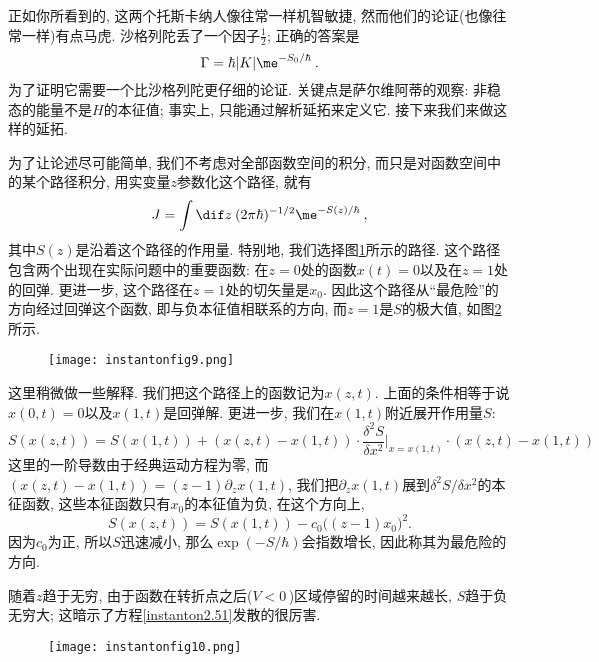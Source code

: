 正如你所看到的, 这两个托斯卡纳人像往常一样机智敏捷, 然而他们的论证(也像往常一样)有点马虎. 沙格列陀丢了一个因子$\tfrac{1}{2}$; 正确的答案是
\begin{equation}
    \Gamma= \hbar \lvert K \rvert \me^{-S_{0}/\hbar} \:. \label{instanton2.50}
\end{equation}
为了证明它需要一个比沙格列陀更仔细的论证. 关键点是萨尔维阿蒂的观察: 非稳态的能量不是$H$的本征值; 事实上, 只能通过解析延拓来定义它. 
接下来我们来做这样的延拓.

为了让论述尽可能简单, 我们不考虑对全部函数空间的积分, 而只是对函数空间中的某个路径积分, 用实变量$z$参数化这个路径, 就有
\begin{equation}
    J=\int \dif z\: (2\pi\hbar)^{-1/2}\me^{-S(z)/\hbar} \:, \label{instanton2.51}
\end{equation}
其中$S(z)$是沿着这个路径的作用量. 特别地, 我们选择图\ref{instantonfig9}所示的路径. 这个路径包含两个出现在实际问题中的重要函数: 在$z=0$处的函数$x(t)=0$以及在$z=1$处的回弹. 更进一步, 这个路径在$z=1$处的切矢量是$x_{0}$. 因此这个路径从``最危险''的方向经过回弹这个函数, 即与负本征值相联系的方向, 而$z=1$是$S$的极大值, 如图\ref{instantonfig10}所示. 


  \begin{figure}[h]
    \centering
    \texttt{[image: instantonfig9.png]}
    \caption{ \label{instantonfig9}}
  \end{figure}
\begin{tcolorbox}
    \begin{remark}
        这里稍微做一些解释. 我们把这个路径上的函数记为$x(z,t)$. 上面的条件相等于说$x(0,t)=0$以及$x(1,t)$是回弹解. 更进一步, 我们在$x(1,t)$附近展开作用量$S$:
        \[
        S(x(z,t))= S(x(1,t))+(x(z,t)-x(1,t))  \cdot \frac{\delta^{2}S}{\delta x^{2}}\biggr\vert_{x=x(1,t)}\cdot (x(z,t)-x(1,t))  
        \]
        这里的一阶导数由于经典运动方程为零, 而$(x(z,t)-x(1,t))=(z-1)\partial_{z}x(1,t)$, 我们把$\partial_{z}x(1,t)$展到$\delta^{2}S/\delta x^{2}$的本征函数, 这些本征函数只有$x_{0}$的本征值为负, 在这个方向上,
        \[
            S(x(z,t))=   S(x(1,t))-c_{0}\bigl((z-1)x_{0}\bigr)^{2}.
        \]
        因为$c_{0}$为正, 所以$S$迅速减小, 那么$\exp(-S/\hbar)$会指数增长, 因此称其为最危险的方向.
    \end{remark}    
\end{tcolorbox}
\noindent 随着$z$趋于无穷, 由于函数在转折点之后($V<0\,$)区域停留的时间越来越长, $S$趋于负无穷大; 这暗示了方程\eqref{instanton2.51}发散的很厉害.

\begin{figure}[h]
    \centering
    \texttt{[image: instantonfig10.png]}
    \caption{ \label{instantonfig10}}
  \end{figure}

